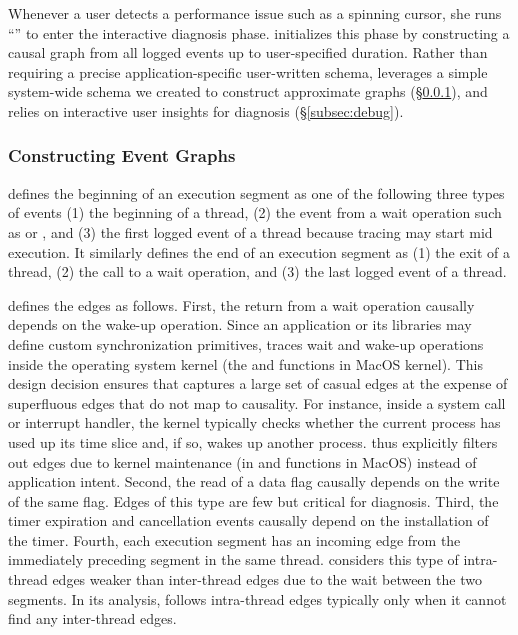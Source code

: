 Whenever a user detects a performance issue such as a spinning cursor, she runs
``'' to enter the interactive diagnosis phase.  \xxx initializes
this phase by constructing a causal graph from all logged events up to
user-specified duration.  Rather than requiring a precise application-specific
user-written schema, \xxx leverages a simple system-wide schema we created to
construct approximate graphs (\S\ref{subsec:graph}), and relies on interactive
user insights for diagnosis (\S\ref{subsec:debug}).

\subsubsection{Constructing Event Graphs} \label{subsec:graph}

\xxx defines the beginning of an execution segment as one of the following
three types of events (1) the beginning of a thread, (2) the event from a wait
operation such as  or , and
(3) the first logged event of a thread because tracing may start mid execution.
It similarly defines the end of an execution segment as (1) the exit of a
thread, (2) the call to a wait operation, and (3) the last logged event of a
thread.

\xxx defines the edges as follows.  First, the return from a wait operation
causally depends on the wake-up operation.  Since an application or its
libraries may define custom synchronization primitives, \xxx traces wait and
wake-up operations inside the operating system kernel (the
 and  functions in MacOS
kernel).  This design decision ensures that \xxx captures a large set of casual
edges at the expense of superfluous edges that do not map to causality.  For
instance, inside a system call or interrupt handler, the kernel typically
checks whether the current process has used up its time slice and, if so, wakes
up another process.  \xxx thus explicitly filters out edges due to kernel
maintenance (in  and 
functions in MacOS) instead of application intent.  Second, the read of a data
flag causally depends on the write of the same flag.  Edges of this type are
few but critical for diagnosis.  Third, the timer expiration and cancellation
events causally depend on the installation of the timer.  Fourth, each
execution segment has an incoming edge from the immediately preceding segment
in the same thread.  \xxx considers this type of intra-thread edges weaker than
inter-thread edges due to the wait between the two segments.  In its analysis,
\xxx follows intra-thread edges typically only when it cannot find any
inter-thread edges.

